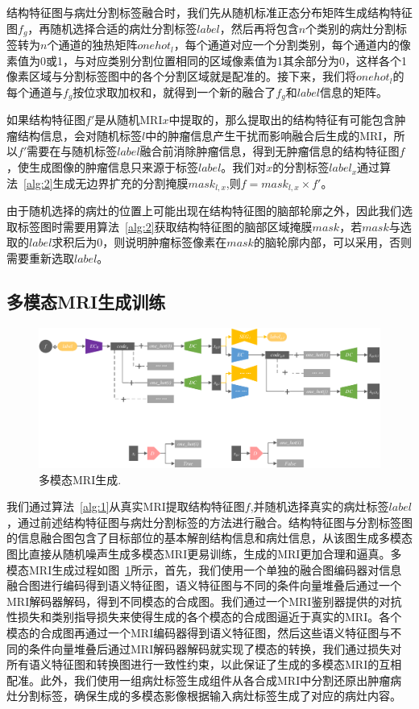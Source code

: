 \documentclass[letterpaper]{article} %
\begin{document}
结构特征图与病灶分割标签融合时，我们先从随机标准正态分布矩阵生成结构特征图$f_g$，再随机选择合适的病灶分割标签$label$，然后再将包含$n$个类别的病灶分割标签转为$n$个通道的独热矩阵$onehot_l$，每个通道对应一个分割类别，每个通道内的像素值为0或1，与对应类别分割位置相同的区域像素值为1其余部分为0，这样各个1像素区域与分割标签图中的各个分割区域就是配准的。接下来，我们将$onehot_l$的每个通道与$f_g$按位求取加权和，就得到一个新的融合了$f_g$和$label$信息的矩阵。

如果结构特征图$f'$是从随机MRI$x$中提取的，那么提取出的结构特征有可能包含肿瘤结构信息，会对随机标签$l$中的肿瘤信息产生干扰而影响融合后生成的MRI，所以$f'$需要在与随机标签$label$融合前消除肿瘤信息，得到无肿瘤信息的结构特征图$f$，使生成图像的肿瘤信息只来源于标签$label$。我们对$x$的分割标签$label_x$通过算法~\ref{alg:2}生成无边界扩充的分割掩膜$mask_{l,x}$,则$f=mask_{l,x}\times f'$。

由于随机选择的病灶的位置上可能出现在结构特征图的脑部轮廓之外，因此我们选取标签图时需要用算法~\ref{alg:2}获取结构特征图的脑部区域掩膜$mask$，若$mask$与选取的$label$求积后为0，则说明肿瘤标签像素在$mask$的脑轮廓内部，可以采用，否则需要重新选取$label$。

\subsection{多模态MRI生成训练}
\begin{figure}
	\centering
	\includegraphics[width=0.98\columnwidth]{figures/mm_mri_generate}
	\caption{多模态MRI生成.}
	\label{mm_mri_generate}
\end{figure}

我们通过算法~\ref{alg:1}从真实MRI提取结构特征图$f$,并随机选择真实的病灶标签$label$，通过前述结构特征图与病灶分割标签的方法进行融合。结构特征图与分割标签图的信息融合图包含了目标部位的基本解剖结构信息和病灶信息，从该图生成多模态图比直接从随机噪声生成多模态MRI更易训练，生成的MRI更加合理和逼真。多模态MRI生成过程如图~\ref{mm_mri_generate}所示，首先，我们使用一个单独的融合图编码器对信息融合图进行编码得到语义特征图，语义特征图与不同的条件向量堆叠后通过一个MRI解码器解码，得到不同模态的合成图。我们通过一个MRI鉴别器提供的对抗性损失和类别指导损失来使得生成的各个模态的合成图逼近于真实的MRI。各个模态的合成图再通过一个MRI编码器得到语义特征图，然后这些语义特征图与不同的条件向量堆叠后通过MRI解码器解码就实现了模态的转换，我们通过损失对所有语义特征图和转换图进行一致性约束，以此保证了生成的多模态MRI的互相配准。此外，我们使用一组病灶标签生成组件从各合成MRI中分割还原出肿瘤病灶分割标签，确保生成的多模态影像根据输入病灶标签生成了对应的病灶内容。
\end{document}

